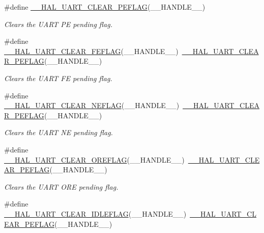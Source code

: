 \begin{DoxyCompactItemize}
\#define \hyperlink{group___u_a_r_t___exported___macros_gaba5e19c60e0f37341b1585a380b84d49}{\+\_\+\+\_\+\+H\+A\+L\+\_\+\+U\+A\+R\+T\+\_\+\+C\+L\+E\+A\+R\+\_\+\+P\+E\+F\+L\+AG}(\+\_\+\+\_\+\+H\+A\+N\+D\+L\+E\+\_\+\+\_\+)
\begin{DoxyCompactList}\small\item\em Clears the U\+A\+RT PE pending flag. \end{DoxyCompactList}\item 
\#define \hyperlink{group___u_a_r_t___exported___macros_gae1dfc7777b089a10464841045b524caa}{\+\_\+\+\_\+\+H\+A\+L\+\_\+\+U\+A\+R\+T\+\_\+\+C\+L\+E\+A\+R\+\_\+\+F\+E\+F\+L\+AG}(\+\_\+\+\_\+\+H\+A\+N\+D\+L\+E\+\_\+\+\_\+)~\hyperlink{group___u_a_r_t___exported___macros_gaba5e19c60e0f37341b1585a380b84d49}{\+\_\+\+\_\+\+H\+A\+L\+\_\+\+U\+A\+R\+T\+\_\+\+C\+L\+E\+A\+R\+\_\+\+P\+E\+F\+L\+AG}(\+\_\+\+\_\+\+H\+A\+N\+D\+L\+E\+\_\+\+\_\+)
\begin{DoxyCompactList}\small\item\em Clears the U\+A\+RT FE pending flag. \end{DoxyCompactList}\item 
\#define \hyperlink{group___u_a_r_t___exported___macros_gaa1f69421585b3ada4d2b81d502a3ae6b}{\+\_\+\+\_\+\+H\+A\+L\+\_\+\+U\+A\+R\+T\+\_\+\+C\+L\+E\+A\+R\+\_\+\+N\+E\+F\+L\+AG}(\+\_\+\+\_\+\+H\+A\+N\+D\+L\+E\+\_\+\+\_\+)~\hyperlink{group___u_a_r_t___exported___macros_gaba5e19c60e0f37341b1585a380b84d49}{\+\_\+\+\_\+\+H\+A\+L\+\_\+\+U\+A\+R\+T\+\_\+\+C\+L\+E\+A\+R\+\_\+\+P\+E\+F\+L\+AG}(\+\_\+\+\_\+\+H\+A\+N\+D\+L\+E\+\_\+\+\_\+)
\begin{DoxyCompactList}\small\item\em Clears the U\+A\+RT NE pending flag. \end{DoxyCompactList}\item 
\#define \hyperlink{group___u_a_r_t___exported___macros_ga9cdc2f2d55eaaa7895996bf6848df42e}{\+\_\+\+\_\+\+H\+A\+L\+\_\+\+U\+A\+R\+T\+\_\+\+C\+L\+E\+A\+R\+\_\+\+O\+R\+E\+F\+L\+AG}(\+\_\+\+\_\+\+H\+A\+N\+D\+L\+E\+\_\+\+\_\+)~\hyperlink{group___u_a_r_t___exported___macros_gaba5e19c60e0f37341b1585a380b84d49}{\+\_\+\+\_\+\+H\+A\+L\+\_\+\+U\+A\+R\+T\+\_\+\+C\+L\+E\+A\+R\+\_\+\+P\+E\+F\+L\+AG}(\+\_\+\+\_\+\+H\+A\+N\+D\+L\+E\+\_\+\+\_\+)
\begin{DoxyCompactList}\small\item\em Clears the U\+A\+RT O\+RE pending flag. \end{DoxyCompactList}\item 
\#define \hyperlink{group___u_a_r_t___exported___macros_ga1345aa0af53d82269b13835c225e91d0}{\+\_\+\+\_\+\+H\+A\+L\+\_\+\+U\+A\+R\+T\+\_\+\+C\+L\+E\+A\+R\+\_\+\+I\+D\+L\+E\+F\+L\+AG}(\+\_\+\+\_\+\+H\+A\+N\+D\+L\+E\+\_\+\+\_\+)~\hyperlink{group___u_a_r_t___exported___macros_gaba5e19c60e0f37341b1585a380b84d49}{\+\_\+\+\_\+\+H\+A\+L\+\_\+\+U\+A\+R\+T\+\_\+\+C\+L\+E\+A\+R\+\_\+\+P\+E\+F\+L\+AG}(\+\_\+\+\_\+\+H\+A\+N\+D\+L\+E\+\_\+\+\_\+)

\end{DoxyCompactItemize}
